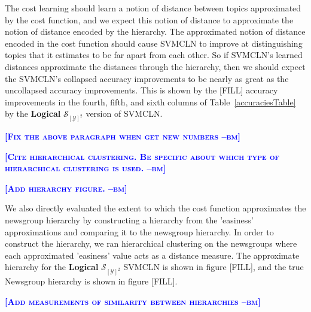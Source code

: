 \documentclass{article} %
\newcommand{\bmcomment}[1]{\textcolor{blue}{\textsc{\textbf{[#1 --bm]}}}}
\begin{document}
The cost learning should learn a notion of distance between topics 
approximated by the cost function, and we expect this notion of distance
to approximate the notion of distance encoded by the hierarchy.  The 
approximated notion of distance encoded in the cost function should 
cause SVMCLN to improve at distinguishing topics that it estimates to
be far apart from each other.  So if SVMCLN's learned distances 
approximate the distances through the hierarchy, then we should expect the SVMCLN's collapsed 
accuracy improvements to be nearly as great as the uncollapsed accuracy
improvements.  This is shown by the [FILL] accuracy improvements in the
fourth, fifth, and sixth columns of Table~\ref{accuraciesTable} by
the \textbf{Logical} $\mathcal{S}_{[\mathcal{Y}]^2}$ version of SVMCLN.

\bmcomment{Fix the above paragraph when get new numbers}

\bmcomment{Cite hierarchical clustering.  Be specific about which
type of hierarchical clustering is used.}

\bmcomment{Add hierarchy figure.}

We also directly evaluated the extent to which the cost function approximates
the newsgroup hierarchy by constructing a hierarchy from the 
'easiness' approximations and comparing it to the newsgroup hierarchy.
In order to construct the hierarchy, we ran hierarchical clustering on
the newsgroups where each approximated 'easiness' value acts as a
distance measure.  The approximate hierarchy for the \textbf{Logical}
$\mathcal{S}_{[\mathcal{Y}]^2}$ SVMCLN is shown in figure [FILL], and the true
Newsgroup hierarchy is shown in figure [FILL].  

\bmcomment{Add measurements of similarity between hierarchies}


%
%
% 
% 
\end{document}
